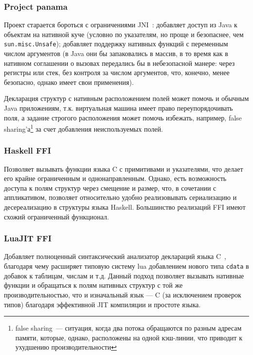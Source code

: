 \documentclass[times
,titlepage
]{itmo-student-thesis}
\begin{document}
\subsubsection{Project panama}
Проект старается бороться с ограничениями JNI~\cite{project-panama-overview}: добавляет доступ из Java к объектам на нативной куче (условно по указателям, но проще и безопаснее, чем \texttt{sun.misc.Unsafe}); добавляет поддержку нативных функций с переменным числом аргументов (в Java они бы запаковались в массив, в то время как в нативном соглашении о вызовах передались бы в небезопасной манере: через регистры или стек, без контроля за числом аргументов, что, конечно, менее безопасно, однако имеет свои применения).

Декларация структур с нативным расположением полей может помочь и обычным Java приложениям, т.к. виртуальная машина имеет право переупорядочивать поля, а задание строгого расположения может помочь избежать, например, false sharing'а\footnote{false sharing~--- ситуация, когда два потока обращаются по разным адресам памяти, которые, однако, расположены на одной кэш-линии, что приводит к ухудшению производительности} за счет добавления неиспользуемых полей.
\subsubsection{Haskell FFI}
Позволяет вызывать функции языка C с примитивами и указателями, что делает его крайне ограниченным и однонаправленным. Однако, есть возможность доступа к полям структур через смещение и размер, что, в сочетании с аппликативом, позволяет относительно удобно реализовывать сериализацию и десереализацию в структуры языка Haskell. Большинство реализаций FFI имеют схожий ограниченный функционал.
\subsubsection{LuaJIT FFI}\label{intro:luajitffi}
Добавляет полноценный синтаксический анализатор деклараций языка C~\cite{luajit}, благодаря чему расширяет типовую систему lua добавлением нового типа \texttt{cdata} в добавок к таблицам, числам и т.д. Данный подход позволяет вызывать нативные функции и обращаться к полям нативных структур с той же производительностью, что и изначальный язык --- C (за исключением проверок типов) благодаря эффективной JIT компиляции и простоте языка.
\end{document}
